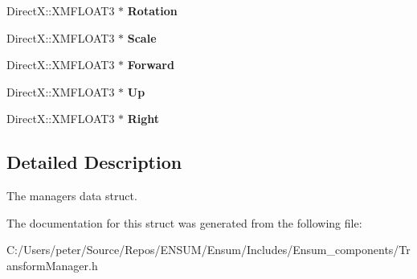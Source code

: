 \begin{DoxyCompactItemize}
\item 
Direct\+X\+::\+X\+M\+F\+L\+O\+A\+T3 $\ast$ {\bfseries Rotation}\hypertarget{struct_ensum_1_1_components_1_1_transform_manager_1_1_transform_components_ab977b81bd5c4233f30e883c1ee339a03}{}\label{struct_ensum_1_1_components_1_1_transform_manager_1_1_transform_components_ab977b81bd5c4233f30e883c1ee339a03}

\item 
Direct\+X\+::\+X\+M\+F\+L\+O\+A\+T3 $\ast$ {\bfseries Scale}\hypertarget{struct_ensum_1_1_components_1_1_transform_manager_1_1_transform_components_a733a0915ffb74c4bf78e68815c297143}{}\label{struct_ensum_1_1_components_1_1_transform_manager_1_1_transform_components_a733a0915ffb74c4bf78e68815c297143}

\item 
Direct\+X\+::\+X\+M\+F\+L\+O\+A\+T3 $\ast$ {\bfseries Forward}\hypertarget{struct_ensum_1_1_components_1_1_transform_manager_1_1_transform_components_a579f47d23db64d88b47e9faf6735c92b}{}\label{struct_ensum_1_1_components_1_1_transform_manager_1_1_transform_components_a579f47d23db64d88b47e9faf6735c92b}

\item 
Direct\+X\+::\+X\+M\+F\+L\+O\+A\+T3 $\ast$ {\bfseries Up}\hypertarget{struct_ensum_1_1_components_1_1_transform_manager_1_1_transform_components_a622847ecf1ee6bacf788f24d041d0b57}{}\label{struct_ensum_1_1_components_1_1_transform_manager_1_1_transform_components_a622847ecf1ee6bacf788f24d041d0b57}

\item 
Direct\+X\+::\+X\+M\+F\+L\+O\+A\+T3 $\ast$ {\bfseries Right}\hypertarget{struct_ensum_1_1_components_1_1_transform_manager_1_1_transform_components_a221c35ddae06ba1f19c54bea7fe62168}{}\label{struct_ensum_1_1_components_1_1_transform_manager_1_1_transform_components_a221c35ddae06ba1f19c54bea7fe62168}

\end{DoxyCompactItemize}


\subsection{Detailed Description}
The managers data struct. 

The documentation for this struct was generated from the following file\+:\begin{DoxyCompactItemize}
\item 
C\+:/\+Users/peter/\+Source/\+Repos/\+E\+N\+S\+U\+M/\+Ensum/\+Includes/\+Ensum\+\_\+components/Transform\+Manager.\+h\end{DoxyCompactItemize}
